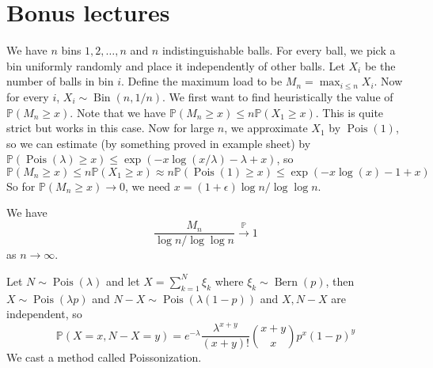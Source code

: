 \section{Bonus lectures}
We have $n$ bins $1,2,\ldots,n$ and $n$ indistinguishable balls.
For every ball, we pick a bin uniformly randomly and place it independently of other balls.
Let $X_i$ be the number of balls in bin $i$.
Define the maximum load to be $M_n=\max_{i\le n}X_i$.
Now for every $i$, $X_i\sim\operatorname{Bin}(n,1/n)$.
We first want to find heuristically the value of $\mathbb P(M_n\ge x)$.
Note that we have $\mathbb P(M_n\ge x)\le n\mathbb P(X_1\ge x)$.
This is quite strict but works in this case.
Now for large $n$, we approximate $X_1$ by $\operatorname{Pois}(1)$, so we can estimate (by something proved in example sheet) by $\mathbb P(\operatorname{Pois}(\lambda)\ge x)\le\exp(-x\log(x/\lambda)-\lambda+x)$, so
$$\mathbb P(M_n\ge x)\le n\mathbb P(X_1\ge x)\approx n\mathbb P(\operatorname{Pois}(1)\ge x)\le \exp(-x\log(x)-1+x)$$
So for $\mathbb P(M_n\ge x)\to 0$, we need $x=(1+\epsilon)\log n/\log\log n$.
\begin{theorem}
    We have
    $$\frac{M_n}{\log n/\log\log n}\xrightarrow{\mathbb P}1$$
    as $n\to\infty$.
\end{theorem}
Let $N\sim\operatorname{Pois}(\lambda)$ and let $X=\sum_{k=1}^N\xi_k$ where $\xi_k\sim\operatorname{Bern}(p)$, then $X\sim\operatorname{Pois}(\lambda p)$ and $N-X\sim\operatorname{Pois}(\lambda(1-p))$ and $X,N-X$ are independent, so
$$\mathbb P(X=x,N-X=y)=e^{-\lambda}\frac{\lambda^{x+y}}{(x+y)!}\binom{x+y}{x}p^x(1-p)^y$$
We cast a method called Poissonization.
